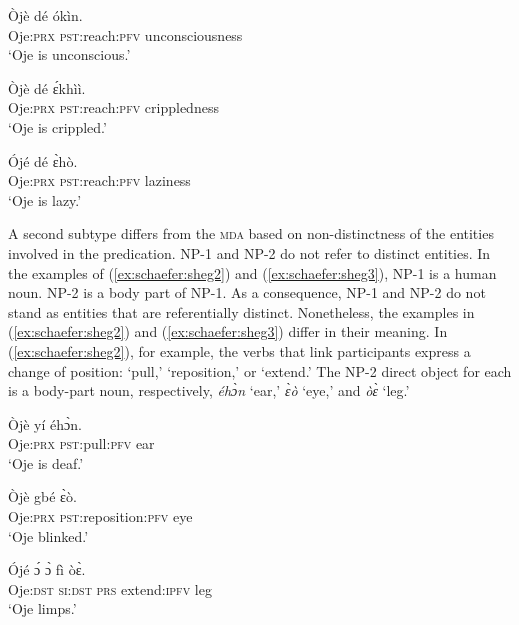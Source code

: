 \documentclass[output=paper,colorlinks,citecolor=brown
]{langscibook}
\begin{document}
 \ea \label{ex:schaefer:sheg1}
\begin{xlist}
\ex \label{ex:schaefer:sheg1a}
\gll Òjè dé ókìn. \\
            Oje:\textsc{prx}	\textsc{pst}:reach:\textsc{pfv}	unconsciousness \\
           \glt  ‘Oje is unconscious.’
           
     \ex \label{ex:schaefer:sheg1b}
     \gll Òjè dé ɛ́khìì. \\
        Oje:\textsc{prx}   \textsc{pst}:reach:\textsc{pfv} crippledness \\
        \glt ‘Oje is crippled.’ 

    \ex \label{ex:schaefer:sheg1c}
     \gll Ójé dé ɛ̀hò. \\
        Oje:\textsc{prx}   \textsc{pst}:reach:\textsc{pfv} laziness \\
        \glt ‘Oje is lazy.’
    
\end{xlist}
\z

A second subtype differs from the \textsc{mda} based on non-distinctness of the entities involved in the predication. NP-1 and NP-2 do not refer to distinct entities. In the examples of (\ref{ex:schaefer:sheg2}) and (\ref{ex:schaefer:sheg3}), NP-1 is a human noun. NP-2 is a body part of NP-1. As a consequence, NP-1 and NP-2 do not stand as entities that are referentially distinct. Nonetheless, the examples in (\ref{ex:schaefer:sheg2}) and (\ref{ex:schaefer:sheg3}) differ in their meaning. In (\ref{ex:schaefer:sheg2}), for example, the verbs that link participants express a change of position: ‘pull,’ ‘reposition,’ or ‘extend.’ The NP-2 direct object for each is a body-part noun, respectively, \textit{éhɔ̀n} ‘ear,’ \textit{ɛ̀ò} ‘eye,’ and \textit{òɛ̀} ‘leg.’ 

 \ea \label{ex:schaefer:sheg2}
\begin{xlist}
\ex \label{ex:schaefer:sheg2a}
\gll Òjè yí éhɔ̀n. \\
            Oje:\textsc{prx}	\textsc{pst}:pull:\textsc{pfv}	ear \\
           \glt  ‘Oje is deaf.’

    \ex \label{ex:schaefer:sheg2b}
     \gll Òjè gbé ɛ̀ò. \\
        Oje:\textsc{prx}   \textsc{pst}:reposition:\textsc{pfv} eye \\
        \glt ‘Oje blinked.’

    \ex \label{ex:schaefer:sheg2c}
        \gll Ójé ɔ́ ɔ̀ fì òɛ̀.
        \\
        Oje:\textsc{dst}   \textsc{si:dst} \textsc{prs} extend:\textsc{ipfv} leg
        \\
        \glt ‘Oje limps.’
    
\end{xlist}
\z
\end{document}
